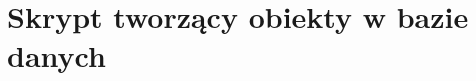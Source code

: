 \section{Skrypt tworzący obiekty w bazie danych}





\newpage



\newpage



\newpage



\newpage



\newpage



\newpage



%

\newpage

